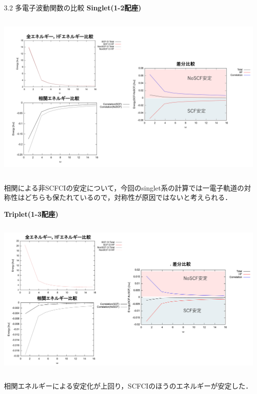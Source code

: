 \documentclass{beamer}
\begin{document}
\begin{frame}{3.2 多電子波動関数の比較}
  \textbf{Singlet(1-2配座)}
  \begin{columns}
    \begin{center}
        \includegraphics[width=1.0\linewidth]{imeges/1-2/画像5.png}
    \end{center}
  \end{columns} 
相関による非SCFCIの安定について，今回のsinglet系の計算では一電子軌道の対称性はどちらも保たれているので，対称性が原因ではないと考えられる．
\end{frame}  

\begin{frame}{}
  \textbf{Triplet(1-3配座)}
  \begin{columns}
    \begin{center}
        \includegraphics[width=1.0\linewidth]{imeges/1-3/データエネルギー.png}
    \end{center}
  \end{columns}
    相関エネルギーによる安定化が上回り，SCFCIのほうのエネルギーが安定した． 
\end{frame}  
\end{document}
